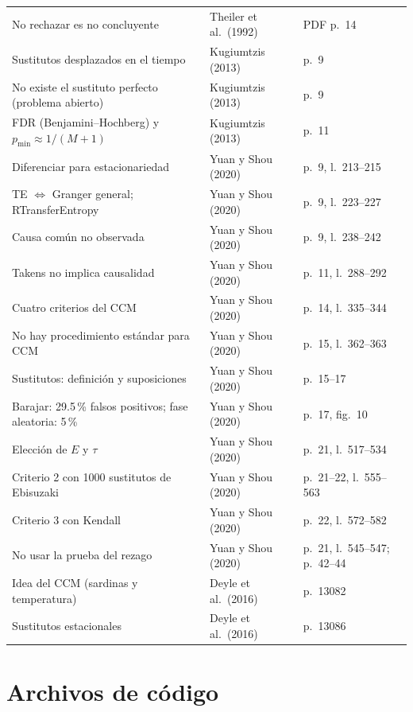 \documentclass[11pt,openany]{book}
\begin{document}
\begin{center}
\begin{longtable}{>{\raggedright}p{6.4cm}>{\raggedright}p{3.6cm}>{\raggedright\arraybackslash}p{4.2cm}}
No rechazar es no concluyente & Theiler et al.\ (1992) & PDF p.~14 \\
Sustitutos desplazados en el tiempo & Kugiumtzis (2013) & p.~9 \\
No existe el sustituto perfecto (problema abierto) & Kugiumtzis (2013) & p.~9 \\
FDR (Benjamini--Hochberg) y $p_{\min} \approx 1/(M+1)$ & Kugiumtzis (2013) & p.~11 \\
Diferenciar para estacionariedad & Yuan y Shou (2020) & p.~9, l.~213--215 \\
TE $\Leftrightarrow$ Granger general; RTransferEntropy & Yuan y Shou (2020) & p.~9, l.~223--227 \\
Causa común no observada & Yuan y Shou (2020) & p.~9, l.~238--242 \\
Takens no implica causalidad & Yuan y Shou (2020) & p.~11, l.~288--292 \\
Cuatro criterios del CCM & Yuan y Shou (2020) & p.~14, l.~335--344 \\
No hay procedimiento estándar para CCM & Yuan y Shou (2020) & p.~15, l.~362--363 \\
Sustitutos: definición y suposiciones & Yuan y Shou (2020) & p.~15--17 \\
Barajar: 29.5\,\% falsos positivos; fase aleatoria: 5\,\% & Yuan y Shou (2020) & p.~17, fig.~10 \\
Elección de $E$ y $\tau$ & Yuan y Shou (2020) & p.~21, l.~517--534 \\
Criterio 2 con 1000 sustitutos de Ebisuzaki & Yuan y Shou (2020) & p.~21--22, l.~555--563 \\
Criterio 3 con Kendall & Yuan y Shou (2020) & p.~22, l.~572--582 \\
No usar la prueba del rezago & Yuan y Shou (2020) & p.~21, l.~545--547; p.~42--44 \\
Idea del CCM (sardinas y temperatura) & Deyle et al.\ (2016) & p.~13082 \\
Sustitutos estacionales & Deyle et al.\ (2016) & p.~13086 \\
\bottomrule
\end{longtable}
\end{center}

\chapter{Archivos de código}
\end{document}
